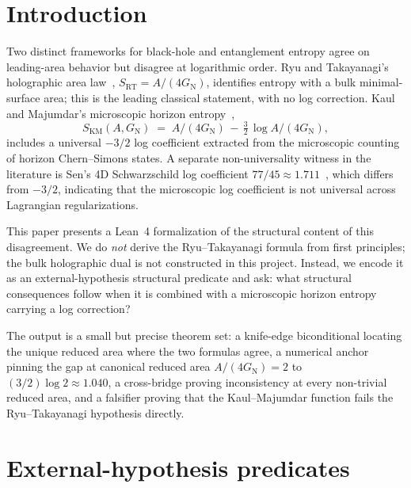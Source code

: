 \documentclass[twocolumn]{revtex4-2}
\newcommand{\GN}{G_{\mathrm{N}}}
\newcommand{\redArea}{A/(4\GN)}
\begin{document}
\maketitle

\section{Introduction}
\label{sec:intro}

Two distinct frameworks for black-hole and entanglement entropy
agree on leading-area behavior but disagree at logarithmic order.
Ryu and Takayanagi's holographic area law~\cite{RyuTakayanagi2006},
$S_{\mathrm{RT}} = A / (4 \GN)$, identifies entropy with a bulk
minimal-surface area; this is the leading classical statement, with
no log correction. Kaul and Majumdar's microscopic horizon
entropy~\cite{KaulMajumdar2000},
\begin{equation}
S_{\mathrm{KM}}(A, \GN) \;=\; \redArea \,-\, \tfrac{3}{2}\,\log\!\redArea,
\label{eq:km}
\end{equation}
includes a universal $-3/2$ log coefficient extracted from the
microscopic counting of horizon Chern--Simons states. A separate
non-universality witness in the literature is Sen's 4D Schwarzschild
log coefficient $77/45 \approx 1.711$~\cite{Sen2013Schwarzschild},
which differs from $-3/2$,
indicating that the microscopic log coefficient is not universal
across Lagrangian regularizations.

This paper presents a Lean~4 formalization of the structural content
of this disagreement. We do \emph{not} derive the Ryu--Takayanagi
formula from first principles; the bulk holographic dual is not
constructed in this project. Instead, we encode it as an
external-hypothesis structural predicate and ask: what structural
consequences follow when it is combined with a microscopic horizon
entropy carrying a log correction?

The output is a small but precise theorem set: a knife-edge
biconditional locating the unique reduced area where the two
formulas agree, a numerical anchor pinning the gap at canonical
reduced area $A/(4\GN) = 2$ to $(3/2)\log 2 \approx 1.040$, a
cross-bridge proving inconsistency at every non-trivial reduced area,
and a falsifier proving that the Kaul--Majumdar function fails the
Ryu--Takayanagi hypothesis directly.

\section{External-hypothesis predicates}
\label{sec:tracked}
\end{document}
